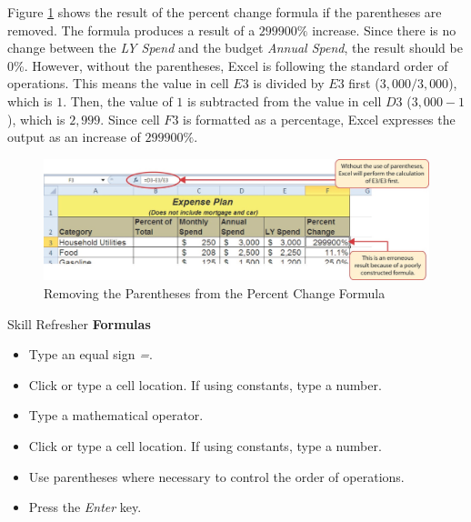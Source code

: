 Figure \ref{02:fig07} shows the result of the percent change formula if the parentheses are removed. The formula produces a result of a $ 299900\% $ increase. Since there is no change between the \textit{LY Spend} and the budget \textit{Annual Spend}, the result should be 0\%. However, without the parentheses, Excel is following the standard order of operations. This means the value in cell $ E3 $ is divided by $ E3 $ first ($ 3,000 / 3,000 $), which is $ 1 $. Then, the value of $ 1 $ is subtracted from the value in cell $ D3 $ ($ 3,000 - 1 $), which is $ 2,999 $. Since cell $ F3 $ is formatted as a percentage, Excel expresses the output as an increase of $ 299900\% $.

\begin{figure}[H]
	\centering
	\includegraphics[width=\maxwidth{.95\linewidth}]{gfx/ch02_fig07}
	\caption{Removing the Parentheses from the Percent Change Formula}
	\label{02:fig07}
\end{figure}

\begin{center}
	\begin{sklbox}{Skill Refresher}
		\textbf{Formulas}
		\\
		\begin{itemize}
			\setlength{\itemsep}{0pt}
			\setlength{\parskip}{0pt}
			\setlength{\parsep}{0pt}
			
			\item Type an equal sign \textit{=}.
			\item Click or type a cell location. If using constants, type a number.
			\item Type a mathematical operator.
			\item Click or type a cell location. If using constants, type a number.
			\item Use parentheses where necessary to control the order of operations.
			\item Press the \textit{Enter} key.

		\end{itemize}
	\end{sklbox}
\end{center}

